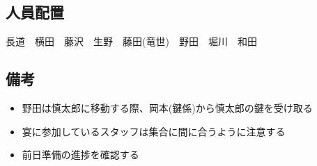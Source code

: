 \subsection{人員配置}
\begin{description}
  \item 長道　横田　藤沢　生野　藤田(竜世)　野田　堀川　和田　
\end{description}

\subsection{備考}
\begin{itemize}
  \item 野田は慎太郎に移動する際、岡本(鍵係)から慎太郎の鍵を受け取る
  \item 宴に参加しているスタッフは集合に間に合うように注意する
  \item 前日準備の進捗を確認する
\end{itemize}

%
